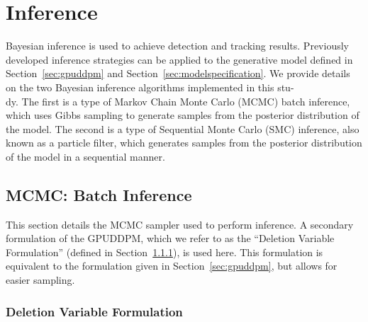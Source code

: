 \documentclass[twocolumn, final]{svjour3}
\begin{document}




\section{Inference}
\label{sec:inference}

Bayesian inference is used to achieve detection and tracking results. Previously developed inference strategies can be applied to the generative model defined in Section~\ref{sec:gpuddpm} and Section~\ref{sec:modelspecification}. We provide details on the two Bayesian inference algorithms implemented in this stu-\\dy. The first is a type of Markov Chain Monte Carlo (MCMC) batch inference, which uses Gibbs sampling to generate samples from the posterior distribution of the model. The second is a type of Sequential Monte Carlo (SMC) inference, also known as a particle filter, which generates samples from the posterior distribution of the model in a sequential manner.


\subsection{MCMC: Batch Inference}
\label{sec:MCMC}

This section details the MCMC sampler used to perform inference.
A secondary formulation of the GPUDDPM, which we refer to as the ``Deletion Variable Formulation'' (defined in Section~\ref{sec:deletionvariableformulation}), is used here. This formulation is equivalent to the formulation given in Section~\ref{sec:gpuddpm}, but allows for easier sampling.


\subsubsection{Deletion Variable Formulation}
\label{sec:deletionvariableformulation}
\end{document}
